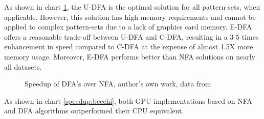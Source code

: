 \documentclass[10pt,onecolumn,twoside,english,a4paper]{article}
\begin{document}
As shown in chart \ref{speed NFA/DFA:becchi}, the U-DFA is the optimal solution for all pattern-sets, when applicable. However, this solution has high memory requirements and cannot be applied to complex pattern-sets due to a lack of graphics card memory.
E-DFA offers a reasonable trade-off between U-DFA and C-DFA, resulting in a 3-5 times enhancement in speed compared to C-DFA at the expense of almost 1.5X more memory usage. Moreover, E-DFA performs better than NFA solutions on nearly all datasets.

\begin{figure}[h!]
  \centering
  \caption{Speedup of DFA's over NFA, author's own work, data from \cite{Becchi:regex_large_dataset}}
  \label{speed NFA/DFA:becchi}
\end{figure}

As shown in chart \ref{speedup:becchi}, both GPU implementations based on NFA and DFA algorithms outperformed their CPU equivalent.
\end{document}
